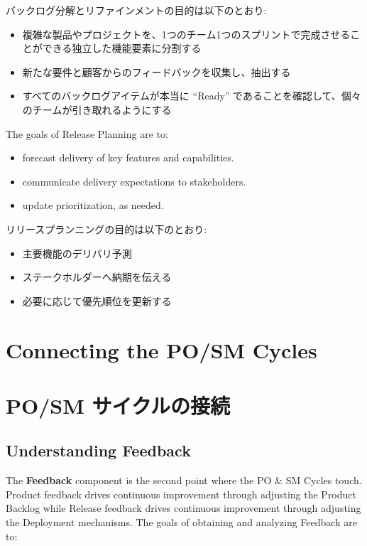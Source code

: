 \documentclass[12pt,a4paper,parskip=full]{scrartcl}
\begin{document}
\fi
バックログ分解とリファインメントの目的は以下のとおり:
\begin{itemize}
\item 複雑な製品やプロジェクトを、1つのチーム1つのスプリントで完成させることができる独立した機能要素に分割する
\item 新たな要件と顧客からのフィードバックを収集し、抽出する
\item すべてのバックログアイテムが本当に ``Ready'' であることを確認して、個々のチームが引き取れるようにする
\end{itemize}
The goals of Release Planning are to:
\begin{itemize}
\item forecast delivery of key features and capabilities.
\item communicate delivery expectations to stakeholders.
\item update prioritization, as needed.
\end{itemize}
\fi
リリースプランニングの目的は以下のとおり:
\begin{itemize}
\item 主要機能のデリバリ予測
\item ステークホルダーへ納期を伝える
\item 必要に応じて優先順位を更新する
\end{itemize}

\section{Connecting the PO/SM Cycles}
\fi
\section{PO/SM サイクルの接続}

\subsection{Understanding Feedback}
The \textbf{Feedback} component is the second point where the PO \& SM
Cycles touch. Product feedback drives continuous improvement through
adjusting the Product Backlog while Release feedback drives continuous
improvement through adjusting the Deployment mechanisms. The goals of
obtaining and analyzing Feedback are to:
\fi
\end{document}
